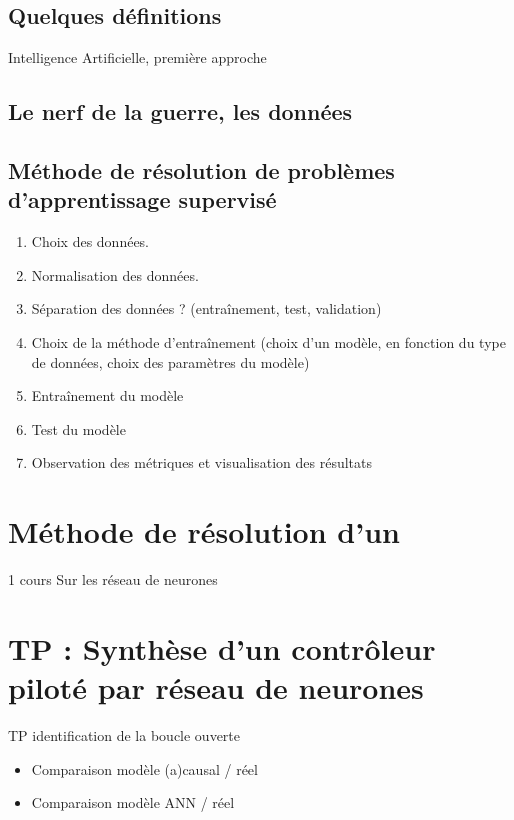 \subsection{Quelques définitions}
\begin{defi}{Intelligence Artificielle, première approche}

\end{defi}

\subsection{Le nerf de la guerre, les données}



\subsection{Méthode de résolution de problèmes d'apprentissage supervisé}

\begin{enumerate}
\item Choix des données.
\item Normalisation des données. 
\item Séparation des données ? (entraînement, test, validation)
\item Choix de la méthode d’entraînement (choix d'un modèle, en fonction du type de données, choix des paramètres du modèle)
\item Entraînement du modèle
\item Test du modèle
\item Observation des métriques et visualisation des résultats
\end{enumerate}

\section{Méthode de résolution d'un }

\newpage


1 cours Sur les réseau de neurones

\section{TP : Synthèse d'un contrôleur piloté par réseau de neurones}

TP identification de la boucle ouverte  
\begin{itemize}
\item Comparaison modèle (a)causal / réel
\item Comparaison modèle ANN / réel
\end{itemize}


